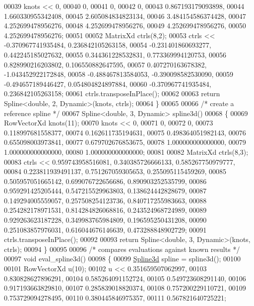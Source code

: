 \begin{DoxyCode}
00039   knots << 0,
00040     0,
00041     0,
00042     0,
00043     0.867193179093898,
00044     1.660330955342408,
00045     2.605084834823134,
00046     3.484154586374428,
00047     4.252699478956276,
00048     4.252699478956276,
00049     4.252699478956276,
00050     4.252699478956276;
00051 
00052   MatrixXd ctrls(8,2);
00053   ctrls << -0.370967741935484,   0.236842105263158,
00054     -0.231401860693277,   0.442245185027632,
00055     0.344361228532831,   0.773369994120753,
00056     0.828990216203802,   0.106550882647595,
00057     0.407270163678382,  -1.043452922172848,
00058     -0.488467813584053,  -0.390098582530090,
00059     -0.494657189446427,   0.054804824897884,
00060     -0.370967741935484,   0.236842105263158;
00061   ctrls.transposeInPlace();
00062 
00063   \textcolor{keywordflow}{return} Spline<double, 2, Dynamic>(knots, ctrls);
00064 \}
00065 
00066 \textcolor{comment}{/* create a reference spline */}
00067 Spline<double, 3, Dynamic> spline3d()
00068 \{
00069   RowVectorXd knots(11);
00070   knots << 0,
00071     0,
00072     0,
00073     0.118997681558377,
00074     0.162611735194631,
00075     0.498364051982143,
00076     0.655098003973841,
00077     0.679702676853675,
00078     1.000000000000000,
00079     1.000000000000000,
00080     1.000000000000000;
00081 
00082   MatrixXd ctrls(8,3);
00083   ctrls <<    0.959743958516081,   0.340385726666133,   0.585267750979777,
00084     0.223811939491137,   0.751267059305653,   0.255095115459269,
00085     0.505957051665142,   0.699076722656686,   0.890903252535799,
00086     0.959291425205444,   0.547215529963803,   0.138624442828679,
00087     0.149294005559057,   0.257508254123736,   0.840717255983663,
00088     0.254282178971531,   0.814284826068816,   0.243524968724989,
00089     0.929263623187228,   0.349983765984809,   0.196595250431208,
00090     0.251083857976031,   0.616044676146639,   0.473288848902729;
00091   ctrls.transposeInPlace();
00092 
00093   \textcolor{keywordflow}{return} Spline<double, 3, Dynamic>(knots, ctrls);
00094 \}
00095 
00096 \textcolor{comment}{/* compares evaluations against known results */}
00097 \textcolor{keywordtype}{void} eval\_spline3d()
00098 \{
00099   \hyperlink{namespace_eigen_a652b0c454d2123a13f04922404bed782}{Spline3d} spline = spline3d();
00100 
00101   RowVectorXd u(10);
00102   u << 0.351659507062997,
00103     0.830828627896291,
00104     0.585264091152724,
00105     0.549723608291140,
00106     0.917193663829810,
00107     0.285839018820374,
00108     0.757200229110721,
00109     0.753729094278495,
00110     0.380445846975357,
00111     0.567821640725221;

\end{DoxyCode}
